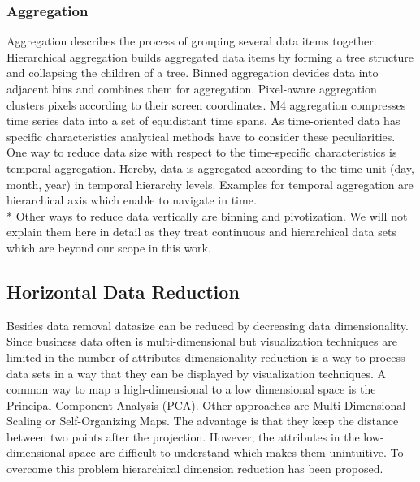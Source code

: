 \subsubsection*{Aggregation}
Aggregation describes the process of grouping several data items together. Hierarchical aggregation builds aggregated data items by forming a tree structure and collapsing the children of a tree\cite{elmqvist2010hierarchical}. Binned aggregation devides data into adjacent bins and combines them for aggregation\cite{Liu2013}. Pixel-aware aggregation clusters pixels according to their screen coordinates\cite{li2016polyspector}. M4 aggregation compresses time series data into a set of equidistant time spans\cite{jugel2014m4}.
As time-oriented data has specific characteristics analytical methods have to consider these peculiarities. One way to reduce data size with respect to the time-specific characteristics is temporal aggregation. Hereby, data is aggregated according to the time unit (day, month, year) in temporal hierarchy levels. Examples for temporal aggregation are hierarchical axis \cite{Chung2014} which enable to navigate in time. 
\\*
Other ways to reduce data vertically are binning and pivotization. We will not explain them here in detail as they treat continuous and hierarchical data sets which are beyond our scope in this work. 

\subsection{Horizontal Data Reduction}
Besides data removal datasize can be reduced by decreasing data dimensionality. Since business data often is multi-dimensional but visualization techniques are limited in the number of attributes dimensionality reduction is a way to process data sets in a way that they can be displayed by visualization techniques. 
A common way to map a high-dimensional to a low dimensional space is the Principal Component Analysis (PCA)\cite{Aigner2008}. Other approaches are Multi-Dimensional Scaling or Self-Organizing Maps\cite{PiringerHarald2011}. The advantage is that they keep the distance between two points after the projection. However, the attributes in the low-dimensional space are difficult to understand which makes them unintuitive. To overcome this problem hierarchical dimension reduction has been proposed. 




